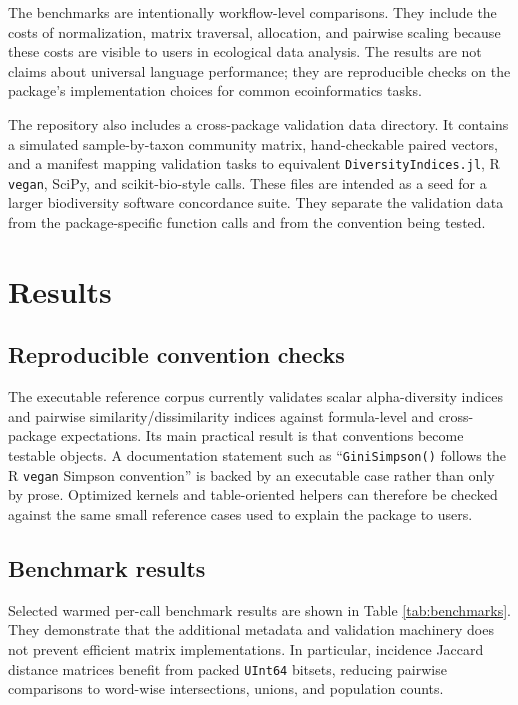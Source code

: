 \documentclass[preprint,12pt,authoryear]{elsarticle}
\begin{document}
The benchmarks are intentionally workflow-level comparisons.  They include
the costs of normalization, matrix traversal, allocation, and pairwise scaling
because these costs are visible to users in ecological data analysis.  The
results are not claims about universal language performance; they are
reproducible checks on the package's implementation choices for common
ecoinformatics tasks.

The repository also includes a cross-package validation data directory.  It
contains a simulated sample-by-taxon community matrix, hand-checkable paired
vectors, and a manifest mapping validation tasks to equivalent
\texttt{DiversityIndices.jl}, R \texttt{vegan}, SciPy, and scikit-bio-style
calls.  These files are intended as a seed for a larger biodiversity software
concordance suite.  They separate the validation data from the package-specific
function calls and from the convention being tested.

\section{Results}

\subsection{Reproducible convention checks}

The executable reference corpus currently validates scalar alpha-diversity
indices and pairwise similarity/dissimilarity indices against formula-level
and cross-package expectations.  Its main practical result is that
conventions become testable objects.  A documentation statement such as
``\texttt{GiniSimpson()} follows the R \texttt{vegan} Simpson convention'' is
backed by an executable case rather than only by prose.  Optimized kernels
and table-oriented helpers can therefore be checked against the same small
reference cases used to explain the package to users.

\subsection{Benchmark results}

Selected warmed per-call benchmark results are shown in Table
\ref{tab:benchmarks}.  They demonstrate that the additional metadata and
validation machinery does not prevent efficient matrix implementations.  In
particular, incidence Jaccard distance matrices benefit from packed
\texttt{UInt64} bitsets, reducing pairwise comparisons to word-wise
intersections, unions, and population counts.
\end{document}
